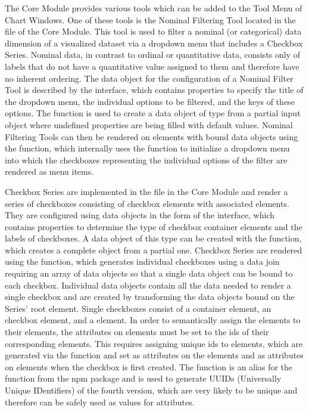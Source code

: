 The Core Module provides various tools which can be added to the Tool
Menu of Chart Windows. One of these tools is the Nominal Filtering
Tool located in the  file of the
Core Module. This tool is used to filter a nominal (or categorical)
data dimension of a visualized dataset via a dropdown menu that
includes a Checkbox Series. Nominal data, in contrast to ordinal or
quantitative data, consists only of labels that do not have a
quantitative value assigned to them and therefore have no inherent
ordering. The data object for the configuration of a Nominal Filter
Tool is described by the  interface, which
contains properties to specify the title of the dropdown menu, the
individual options to be filtered, and the keys of these options. The
 function is used to create a data object
of type  from a partial input object where
undefined properties are being filled with default values. Nominal
Filtering Tools can then be rendered on elements with bound
 data objects using the
 function, which internally uses the
 function to initialize a dropdown menu into
which the checkboxes representing the individual options of the filter
are rendered as menu items.

Checkbox Series are implemented in the  file
in the Core Module and render a series of checkboxes consisting of
checkbox  elements with associated 
elements. They are configured using data objects in the form of the
 interface, which contains properties to
determine the type of checkbox container elements and the labels of
checkboxes. A data object of this type can be created with the
 function, which creates a complete object
from a partial one. Checkbox Series are rendered using the
 function, which generates individual
checkboxes using a data join requiring an array of 
data objects so that a single data object can be bound to each
checkbox. Individual  data objects contain all the data
needed to render a single checkbox and are created by transforming the
 data objects bound on the Series' root element.
Single checkboxes consist of a container element, an 
checkbox element, and a  element. In order to
semantically assign the  elements to their
 elements, the  attributes on 
elements must be set to the ids of their corresponding 
elements. This requires assigning unique ids to 
elements, which are generated via the  function and set as
 attributes on the  elements and as 
attributes on  elements when the checkbox is first
created. The  function is an alias for the 
function from the  npm package \parencite{UUIDPackage} and
is used to generate UUIDs (Universally Unique IDentifiers)
\parencite{UUIDRFC} of the fourth version, which are very likely to be
unique and therefore can be safely used as values for 
attributes.

